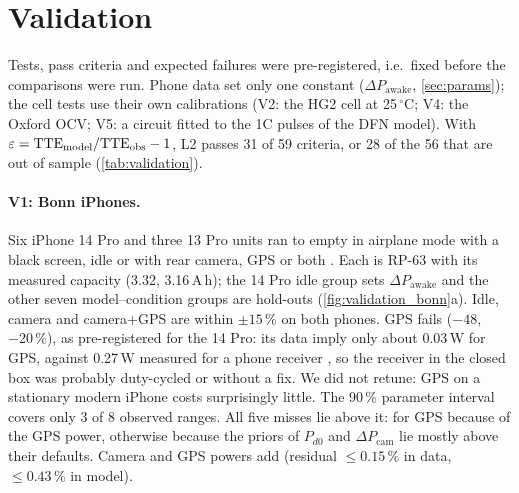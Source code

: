 \section{Validation}\label{sec:validation}

Tests, pass criteria and expected failures were pre-registered, i.e.\ fixed before the comparisons were run. Phone
data set only one constant ($\Delta P_{\mathrm{awake}}$, \cref{sec:params}); the cell tests use their own
calibrations (V2: the HG2 cell at 25\,$^\circ$C; V4: the Oxford OCV; V5: a circuit fitted to the 1C pulses of the
DFN model). With $\varepsilon=\mathrm{TTE}_{\mathrm{model}}/\mathrm{TTE}_{\mathrm{obs}}-1$, L2 passes 31 of 59 criteria, or 28 of the
56 that are out of sample (\cref{tab:validation}).

\begin{table}[t]
\centering\footnotesize
\caption{Pre-registered tests; ``Passed'' counts criteria met by L2 (and the KiBaM variant X9).
$f_Q=Q(T)/Q(25\,^\circ\mathrm C)$ at 40/10/0/$-20\,^\circ$C, tolerance 0.05 (0.10 at $-20\,^\circ$C);
RMSE$_V$ at 40/25/10/0\,$^\circ$C (25\,$^\circ$C is the calibration temperature). In sample: the V1b idle range
and the two 25\,$^\circ$C RMSE$_V$ criteria. V3 and V4 are reported, not scored.}
\label{tab:validation}

\end{table}

\paragraph{V1: Bonn iPhones.} Six iPhone 14 Pro and three 13 Pro units ran to empty in airplane mode with a black
screen, idle or with rear camera, GPS or both \cite{SCH26,BONN26}. Each is RP-63 with its measured capacity
(3.32, 3.16\,A\,h); the 14 Pro idle group sets $\Delta P_{\mathrm{awake}}$ and the other seven model--condition
groups are hold-outs (\cref{fig:validation_bonn}a). Idle, camera and camera+GPS are within $\pm15\,\%$ on both
phones. GPS fails ($-48$, $-20\,\%$), as pre-registered for the 14 Pro: its data imply only about 0.03\,W for GPS,
against 0.27\,W measured for a phone receiver \cite{KW19}, so the receiver in the closed box was probably
duty-cycled or without a fix. We did not retune: GPS on a stationary modern iPhone costs surprisingly little. The
90\,\% parameter interval covers only 3 of 8 observed ranges. All five misses lie above it: for GPS because of the
GPS power, otherwise because the priors of $P_{d0}$ and $\Delta P_{\mathrm{cam}}$ lie mostly above their defaults.
Camera and GPS powers add (residual $\le0.15\,\%$ in data, $\le0.43\,\%$ in model).

